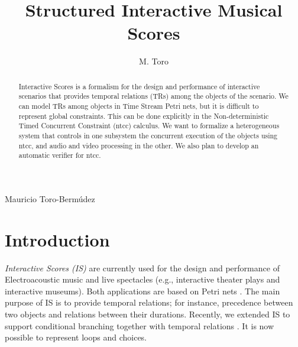 \documentclass[]{lipics-iclp}
\theoremstyle{plain}\newtheorem{mainthm}[thm]{Main Theorem}
\theoremstyle{definition}\newtheorem{crucialdef}[thm]{Crucial Definition}
\begin{document}
\title[Structured Interactive Scores]{Structured Interactive Musical Scores}

\author[lab1]{M. Toro}{Mauricio Toro-Berm\'{u}dez}
\address[lab1]{Universit\'{e} de Bordeaux 1, Laboratoire Bordelais de Recherche en Informatique, B\^{a}timent A30. 351, cours de la Lib\'{e}ration F-33405 Talence cedex, France.}    









\begin{abstract}
  \noindent Interactive Scores is a formalism for the design and
performance of interactive scenarios that provides temporal
relations (TRs)  among the objects of the scenario.
We can model TRs among objects in Time Stream Petri nets, but it is difficult to represent 
global constraints. This can be done
explicitly in the Non-deterministic Timed Concurrent Constraint (ntcc) calculus.
We want to formalize a heterogeneous system that controls in one subsystem
the concurrent execution of the objects using ntcc, and audio and video processing in the other.
We also plan to develop an automatic verifier for ntcc.
\end{abstract}

\maketitle


\section*{Introduction}\label{S:one}

\textit{Interactive Scores (IS)} are currently used for the design and performance of Electroacoustic
music \cite{aadc08} and live spectacles \cite{bamcrs09} (e.g., interactive theater plays and interactive museums). 
 Both applications
are based on Petri nets \cite{artech2008}.
The main purpose of IS is to provide temporal
relations; for instance, precedence between two objects and relations between their durations. Recently, we extended IS to support conditional branching together with temporal relations \cite{tbdcb10}. It is now possible to represent loops and choices.
\end{document}
